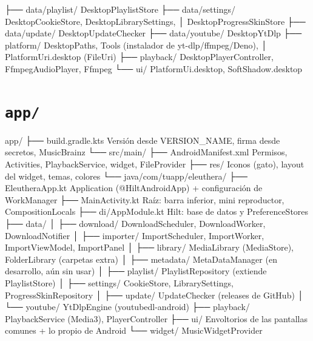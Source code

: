 \documentclass[11pt,a4paper,oneside]{report}
\newcommand{\cod}[1]{\texttt{\small #1}}
\begin{document}
\begin{arbol}
\begin{literal}
        ├── data/playlist/           DesktopPlaylistStore
        ├── data/settings/           DesktopCookieStore, DesktopLibrarySettings,
        │                            DesktopProgressSkinStore
        ├── data/update/             DesktopUpdateChecker
        ├── data/youtube/            DesktopYtDlp
        ├── platform/                DesktopPaths, Tools (instalador de yt-dlp/ffmpeg/Deno),
        │                            PlatformUri.desktop (FileUri)
        ├── playback/                DesktopPlayerController, FfmpegAudioPlayer, Ffmpeg
        └── ui/                      PlatformUi.desktop, SoftShadow.desktop
\end{literal}
\end{arbol}

\section{\texorpdfstring{\cod{app/}}{app/}}

\begin{arbol}
\begin{literal}
app/
├── build.gradle.kts               Versión desde VERSION_NAME, firma desde secretos, MusicBrainz
└── src/main/
    ├── AndroidManifest.xml        Permisos, Activities, PlaybackService, widget, FileProvider
    ├── res/                       Iconos (gato), layout del widget, temas, colores
    └── java/com/tuapp/eleuthera/
        ├── EleutheraApp.kt        Application (@HiltAndroidApp) + configuración de WorkManager
        ├── MainActivity.kt        Raíz: barra inferior, mini reproductor, CompositionLocals
        ├── di/AppModule.kt        Hilt: base de datos y PreferenceStores
        ├── data/
        │   ├── download/          DownloadScheduler, DownloadWorker, DownloadNotifier
        │   ├── importer/          ImportScheduler, ImportWorker, ImportViewModel, ImportPanel
        │   ├── library/           MediaLibrary (MediaStore), FolderLibrary (carpetas extra)
        │   ├── metadata/          MetaDataManager (en desarrollo, aún sin usar)
        │   ├── playlist/          PlaylistRepository (extiende PlaylistStore)
        │   ├── settings/          CookieStore, LibrarySettings, ProgressSkinRepository
        │   ├── update/            UpdateChecker (releases de GitHub)
        │   └── youtube/           YtDlpEngine (youtubedl-android)
        ├── playback/              PlaybackService (Media3), PlayerController
        ├── ui/                    Envoltorios de las pantallas comunes + lo propio de Android
        └── widget/                MusicWidgetProvider
\end{literal}
\end{arbol}
\end{document}
